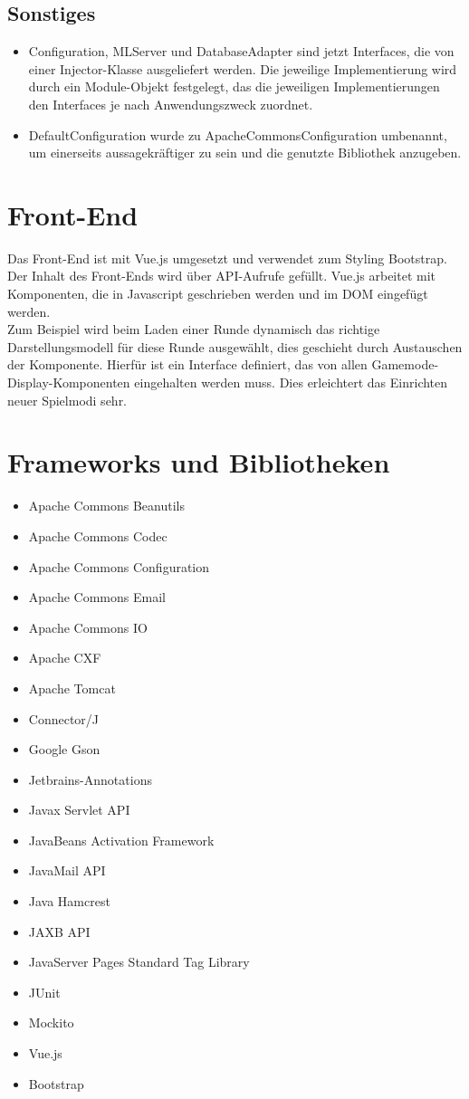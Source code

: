 \documentclass[a4paper]{scrreprt}
\begin{document}
\section{Sonstiges}
\begin{itemize}
    \item Configuration, MLServer und DatabaseAdapter sind jetzt Interfaces, die von einer Injector-Klasse ausgeliefert werden.
    Die jeweilige Implementierung wird durch ein Module-Objekt festgelegt, das die jeweiligen Implementierungen den Interfaces je nach Anwendungszweck zuordnet.
    \item DefaultConfiguration wurde zu ApacheCommonsConfiguration umbenannt, um einerseits aussagekräftiger zu sein und die genutzte Bibliothek anzugeben.
\end{itemize}

\chapter{Front-End}
Das Front-End ist mit Vue.js umgesetzt und verwendet zum Styling Bootstrap. Der Inhalt des Front-Ends wird über API-Aufrufe gefüllt.
Vue.js arbeitet mit Komponenten, die in Javascript geschrieben werden und im DOM eingefügt werden. \\
Zum Beispiel wird beim Laden einer Runde dynamisch das richtige Darstellungsmodell für diese Runde ausgewählt, dies geschieht durch Austauschen der Komponente. Hierfür ist ein Interface definiert, das von allen Gamemode-Display-Komponenten eingehalten werden muss. Dies erleichtert das Einrichten neuer Spielmodi sehr.
\chapter{Frameworks und Bibliotheken}
\begin{itemize}
    \item Apache Commons Beanutils
    \item Apache Commons Codec
    \item Apache Commons Configuration
    \item Apache Commons Email
    \item Apache Commons IO
    \item Apache CXF
    \item Apache Tomcat
    \item Connector/J
    \item Google Gson
    \item Jetbrains-Annotations
    \item Javax Servlet API
    \item JavaBeans Activation Framework
    \item JavaMail API
    \item Java Hamcrest
    \item JAXB API
    \item JavaServer Pages Standard Tag Library
    \item JUnit
    \item Mockito
    \item Vue.js
    \item Bootstrap
\end{itemize}
\end{document}
